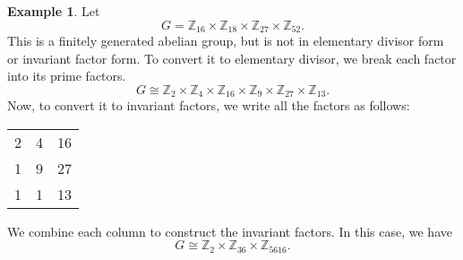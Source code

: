 \documentclass[a4paper, openany]{memoir}
\theoremstyle{definition}
\newtheorem{example}[definition]{Example}
\theoremstyle{plain}
\begin{document}
    \begin{example}
        Let
        \[G = \mathbb{Z}_{16} \times \mathbb{Z}_{18} \times \mathbb{Z}_{27} \times \mathbb{Z}_{52}.\]
        This is a finitely generated abelian group, but is not in elementary divisor form or invariant factor form. To convert it to elementary divisor, we break each factor into its prime factors.
        \[G \cong \mathbb{Z}_2 \times \mathbb{Z}_4 \times \mathbb{Z}_{16} \times \mathbb{Z}_9 \times \mathbb{Z}_{27} \times \mathbb{Z}_{13}.\]
        Now, to convert it to invariant factors, we write all the factors as follows:
        \begin{table}[H]
            \centering
            \begin{tabular}{ccc}
                2 & 4 & 16 \\
                1 & 9 & 27 \\
                1 & 1 & 13 
            \end{tabular}
        \end{table}
        \noindent We combine each column to construct the invariant factors. In this case, we have
        \[G \cong \mathbb{Z}_2 \times \mathbb{Z}_{36} \times \mathbb{Z}_{5616}.\]
    \end{example}
\end{document}

